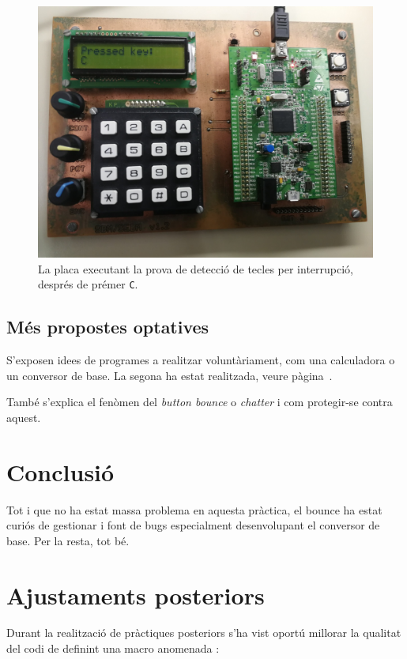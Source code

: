 \begin{figure}
  \includegraphics[width=.99\columnwidth]{../photos/board/c1-intr}
  \caption{ \label{fig:c1-board-intr} La placa executant la prova de detecció de tecles per interrupció, després de prémer \texttt{C}. }
\end{figure}


\subsection{Més propostes optatives}

S'exposen idees de programes a realitzar voluntàriament, com una calculadora o un conversor de base.
La segona ha estat realitzada, veure pàgina~\pageref{ch:basecvt}.

També s'explica el fenòmen del \emph{button bounce} o \emph{chatter} i com protegir-se contra aquest.


\section{Conclusió}

Tot i que no ha estat massa problema en aquesta pràctica, el bounce
ha estat curiós de gestionar i font de bugs especialment desenvolupant
el conversor de base. Per la resta, tot bé.

\section{Ajustaments posteriors}

Durant la realització de pràctiques posteriors s'ha vist oportú millorar la qualitat del codi de 
definint una macro anomenada :

